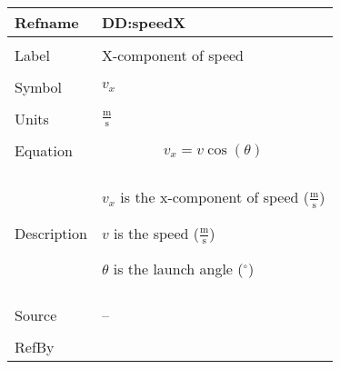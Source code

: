 \documentclass[12pt]{article}
\begin{document}
\noindent \begin{minipage}{\textwidth}
\begin{tabular}{p{} p{}}
\toprule \textbf{Refname} & \textbf{DD:speedX}
\label{DD:speedX}
\\ \midrule \\
Label & X-component of speed
\\ \midrule \\
Symbol & ${v_{x}}$
\\ \midrule \\
Units & $\frac{\text{m}}{\text{s}}$
\\ \midrule \\
Equation & \begin{displaymath}
           {v_{x}}=v \cos\left(θ\right)
           \end{displaymath}
\\ \midrule \\
Description & \begin{symbDescription}
              \item{${v_{x}}$ is the x-component of speed ($\frac{\text{m}}{\text{s}}$)}
              \item{$v$ is the speed ($\frac{\text{m}}{\text{s}}$)}
              \item{$θ$ is the launch angle (${}^{\circ}$)}
              \end{symbDescription}
\\ \midrule \\
Source & --
\\ \midrule \\
RefBy & 
\\ \bottomrule \end{tabular}
\end{minipage}
\par~
\end{document}
